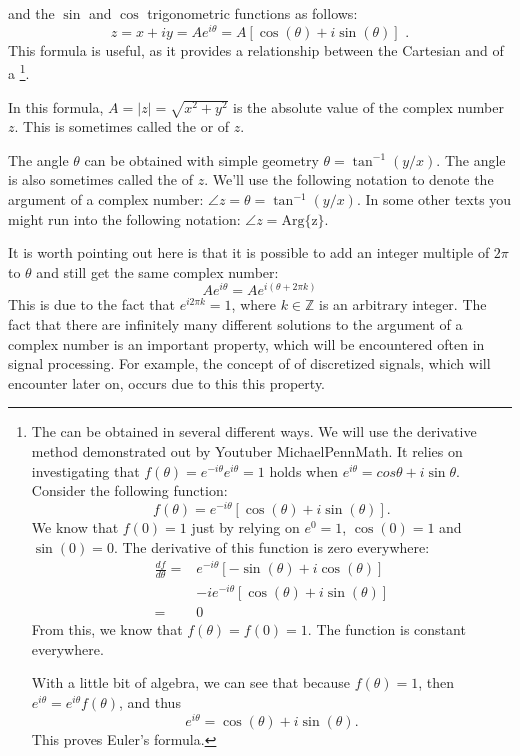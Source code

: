  and the $\sin$ and $\cos$ trigonometric functions as follows:
\begin{equation}
  \boxed{
    z = x + iy = A e^{i\theta} = A[\cos(\theta)+i\sin(\theta)]
  }\,\,.
  \label{eq:eulerintro}
\end{equation}
This formula is useful, as it provides a relationship between the Cartesian and  of a \footnote{The \emph{} can be obtained in several different ways. We will use the derivative method demonstrated out by Youtuber MichaelPennMath. It relies on investigating that $f(\theta)=e^{-i\theta}e^{i\theta}=1$ holds when $e^{i\theta}=cos\theta + i\sin\theta$. Consider the following function:
\[
f(\theta) = e^{-i\theta}[\cos(\theta)+i\sin(\theta)].
\]
We know that $f(0)=1$ just by relying on $e^0=1$, $\cos(0)=1$ and $\sin(0)=0$. The derivative of this function is zero everywhere:
\begin{align*}
\frac{df}{d\theta} =& e^{-i\theta}[-\sin(\theta)+i\cos(\theta)] \\
&- i e^{-i\theta}[\cos(\theta)+i\sin(\theta)] \\
= & 0
\end{align*}
From this, we know that $f(\theta) = f(0) = 1$. The function is constant everywhere.

With a little bit of algebra, we can see that because $f(\theta)=1$, then $e^{i\theta}=e^{i\theta} f(\theta)$, and thus
\[
e^{i\theta} = \cos(\theta) + i\sin(\theta).
\]
This proves Euler's formula.}.



In this formula, $A = |z|=\sqrt{x^2 + y^2}$ is the absolute value of the complex number $z$. This is sometimes called the \emph{} or
\emph{} of $z$.

The angle $\theta$ can be obtained with simple geometry
$\theta=\tan^{-1}(y/x)$. The angle is also sometimes called the \emph{} of $z$. We'll use the following notation to denote the argument of a complex number: $\angle z = \theta = \tan^{-1}(y/x)$. In some other texts you might run into the following notation: $\angle z = \mathrm{Arg\{z\}}$.

It is worth pointing out here is that it is possible to add an integer
multiple of $2\pi$ to $\theta$ and still get the same complex number:
\begin{equation}
  A e^{i\theta} = A e^{i(\theta + 2\pi k)}
\end{equation}
This is due to the fact that $e^{i2\pi k} = 1$, where
$k \in \mathbb{Z}$ is an arbitrary integer. The fact that there are
infinitely many different solutions to the argument of a complex
number is an important property, which will be encountered often in
signal processing. For example, the concept
of \emph{} of discretized signals, which will
encounter later on, occurs due to this this property.

